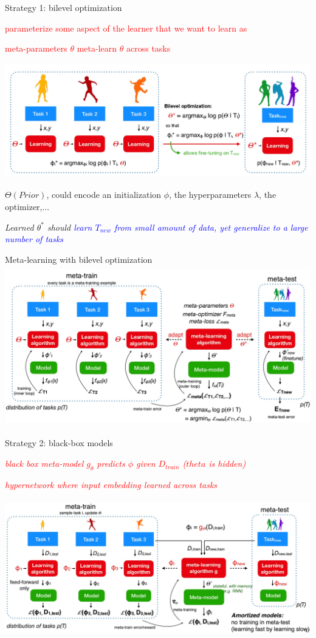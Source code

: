 \begin{frame}{Strategy 1: bilevel optimization}

    \centerline{\textcolor{red}{parameterize some aspect of the learner that we want to learn as}} 
    \centerline{\textcolor{red}{meta-parameters $\theta$ meta-learn $\theta$ across tasks}}
    \centering\includegraphics[height=5cm]{image/img000908.jpg}
    \small\centerline{$\Theta(Prior)$, could encode an initialization $\phi$, the hyperparameters $\lambda$, the optimizer,...}
    \leavevmode\hphantom{ }

    \small\centerline{\textit{Learned $\theta^*$ should \textcolor{blue}{learn $T_{new}$ from small amount of data, yet generalize to a large number of tasks}}}
\end{frame}

\begin{frame}{Meta-learning with bilevel optimization}
    \centering\includegraphics[height=7cm]{image/img002035.jpg}
\end{frame}
\begin{frame}{Strategy 2: black-box models}

    \centerline{\textit{\textcolor{red}{black box meta-model $g_\theta$ predicts $\phi$ given $D_{train}$ ($theta$ is hidden)}}}
    \centerline{\textit{\textcolor{red}{hypernetwork where input embedding learned across tasks}}}
    \centering\includegraphics[height=6cm]{image/img002812.jpg}
\end{frame}

